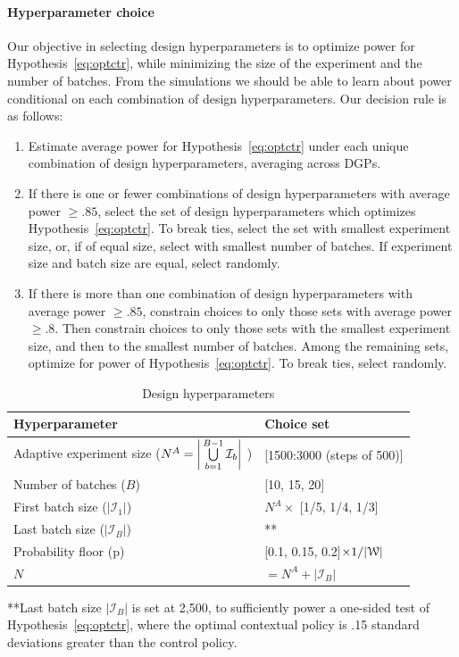 \documentclass[letterpaper, 12pt, parskip=full,DIV=10]{scrartcl}
\begin{document}
\paragraph{Hyperparameter choice}
Our objective in selecting design hyperparameters is to optimize power for Hypothesis~\ref{eq:optctr}, while minimizing the size of the experiment and the number of batches. From the simulations we should be able to learn about power conditional on each combination of design hyperparameters. Our decision rule is as follows:
\begin{enumerate}
\item Estimate average power for Hypothesis~\ref{eq:optctr} under each unique combination of design hyperparameters, averaging across DGPs. 
\item If there is one or fewer combinations of design hyperparameters with average power $\ge.85$, select the set of design hyperparameters which optimizes Hypothesis~\ref{eq:optctr}. To break ties, select the set with smallest experiment size, or, if of equal size, select with smallest number of batches. If experiment size and batch size are equal, select randomly. 
\item If there is more than one combination of design hyperparameters with average power $\ge.85$, constrain choices to only those sets with average power $\ge.8$. Then constrain choices to only those sets with the smallest experiment size, and then to the smallest number of batches. Among the remaining sets, optimize for power of Hypothesis~\ref{eq:optctr}. To break ties, select randomly. 
\end{enumerate}

\begin{table}[H]
\centering
\caption{Design hyperparameters} 
\label{tab:design}
\begin{tabular}{l | l}
\textbf{Hyperparameter} & \textbf{Choice set} \\ \hline
Adaptive experiment size ($N^A = \bigg{\lvert} \bigcup\limits_{b=1}^{B-1} \mathcal{I}_{b} \bigg{\rvert}$ )& [1500:3000 (steps of 500)] \\
Number of batches ($B$)& [10, 15, 20] \\
First batch size ($|\mathcal{I}_1|$) & $N^A \times$ [1/5, 1/4, 1/3] \\
Last batch size ($|\mathcal{I}_B|$) & **  \\
Probability floor (p)& [0.1, 0.15, 0.2]$\times 1/ |{\EuScript W}|$ \\
$N$ & $=N^A + |\mathcal{I}_B| $\\
\hline
\end{tabular}
\end{table}
**Last batch size $|\mathcal{I}_B|$ is set at 2,500, to sufficiently power a one-sided test of Hypothesis~\ref{eq:optctr}, where the optimal contextual policy is .15 standard deviations greater than the control policy. 
\end{document}
